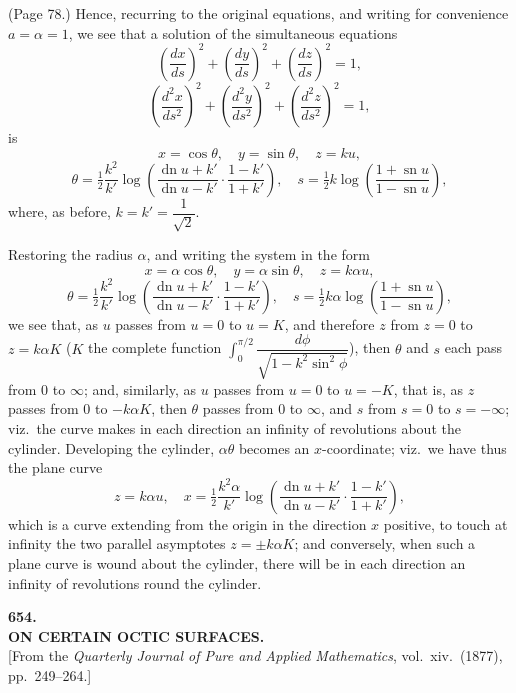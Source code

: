 \documentclass[11pt,a4paper]{article}
\providecommand{\sn}{\operatorname{sn}}
\providecommand{\dn}{\operatorname{dn}}
\begin{document}
\bigskip

\noindent (Page 78.) Hence, recurring to the original equations, and writing for convenience $a = \alpha = 1$, we see that a solution of the simultaneous equations
\[
\left(\frac{dx}{ds}\right)^2 + \left(\frac{dy}{ds}\right)^2 + \left(\frac{dz}{ds}\right)^2 = 1,
\]
\[
\left(\frac{d^2 x}{ds^2}\right)^2 + \left(\frac{d^2 y}{ds^2}\right)^2 + \left(\frac{d^2 z}{ds^2}\right)^2 = 1,
\]
is
\[
x = \cos\theta,\quad y = \sin\theta,\quad z = ku,
\]
\[
\theta = \tfrac{1}{2}\frac{k^2}{k'}\log\left(\frac{\dn u + k'}{\dn u - k'} \cdot \frac{1 - k'}{1 + k'}\right),\quad s = \tfrac{1}{2}k\log\left(\frac{1 + \sn u}{1 - \sn u}\right),
\]
where, as before, $k = k' = \dfrac{1}{\sqrt{2}}$.

Restoring the radius $\alpha$, and writing the system in the form
\[
x = \alpha\cos\theta,\quad y = \alpha\sin\theta,\quad z = k\alpha u,
\]
\[
\theta = \tfrac{1}{2}\frac{k^2}{k'}\log\left(\frac{\dn u + k'}{\dn u - k'} \cdot \frac{1 - k'}{1 + k'}\right),\quad s = \tfrac{1}{2}k\alpha\log\left(\frac{1 + \sn u}{1 - \sn u}\right),
\]
we see that, as $u$ passes from $u = 0$ to $u = K$, and therefore $z$ from $z = 0$ to $z = k\alpha K$ ($K$ the complete function $\displaystyle\int_0^{\pi/2} \dfrac{d\phi}{\sqrt{1 - k^2 \sin^2\phi}}$), then $\theta$ and $s$ each pass from $0$ to $\infty$; and, similarly, as $u$ passes from $u = 0$ to $u = -K$, that is, as $z$ passes from $0$ to $-k\alpha K$, then $\theta$ passes from $0$ to $\infty$, and $s$ from $s = 0$ to $s = -\infty$; viz.\ the curve makes in each direction an infinity of revolutions about the cylinder. Developing the cylinder, $\alpha\theta$ becomes an $x$-coordinate; viz.\ we have thus the plane curve
\[
z = k\alpha u,\quad x = \tfrac{1}{2}\frac{k^2 \alpha}{k'}\log\left(\frac{\dn u + k'}{\dn u - k'} \cdot \frac{1 - k'}{1 + k'}\right),
\]
which is a curve extending from the origin in the direction $x$ positive, to touch at infinity the two parallel asymptotes $z = \pm k\alpha K$; and conversely, when such a plane curve is wound about the cylinder, there will be in each direction an infinity of revolutions round the cylinder.

\newpage


\begin{center}
{\Large\bfseries 654.}\\[1em]
{\large\bfseries ON CERTAIN OCTIC SURFACES.}\\[0.5em]
[From the \textit{Quarterly Journal of Pure and Applied Mathematics}, vol.~xiv.\ (1877), pp.~249--264.]
\end{center}
\end{document}
